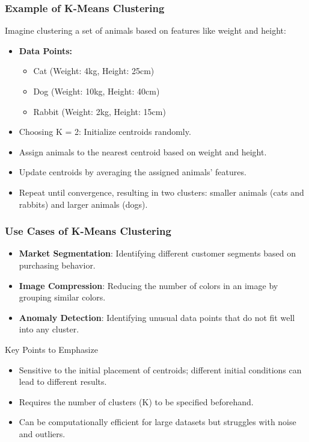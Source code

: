 \documentclass[aspectratio=169]{beamer}
\begin{document}
\begin{frame}[fragile]
    \frametitle{Example of K-Means Clustering}
    \begin{block}{Imagine clustering a set of animals based on features like weight and height:}
        \begin{itemize}
            \item \textbf{Data Points:}
            \begin{itemize}
                \item Cat (Weight: 4kg, Height: 25cm)
                \item Dog (Weight: 10kg, Height: 40cm)
                \item Rabbit (Weight: 2kg, Height: 15cm)
            \end{itemize}
            \item Choosing K = 2: Initialize centroids randomly.
            \item Assign animals to the nearest centroid based on weight and height.
            \item Update centroids by averaging the assigned animals’ features.
            \item Repeat until convergence, resulting in two clusters: smaller animals (cats and rabbits) and larger animals (dogs).
        \end{itemize}
    \end{block}
\end{frame}

\begin{frame}[fragile]
    \frametitle{Use Cases of K-Means Clustering}
    \begin{itemize}
        \item \textbf{Market Segmentation}: Identifying different customer segments based on purchasing behavior.
        \item \textbf{Image Compression}: Reducing the number of colors in an image by grouping similar colors.
        \item \textbf{Anomaly Detection}: Identifying unusual data points that do not fit well into any cluster.
    \end{itemize}
    
    \begin{block}{Key Points to Emphasize}
        \begin{itemize}
            \item Sensitive to the initial placement of centroids; different initial conditions can lead to different results.
            \item Requires the number of clusters (K) to be specified beforehand.
            \item Can be computationally efficient for large datasets but struggles with noise and outliers.
        \end{itemize}
    \end{block}
\end{frame}
\end{document}
